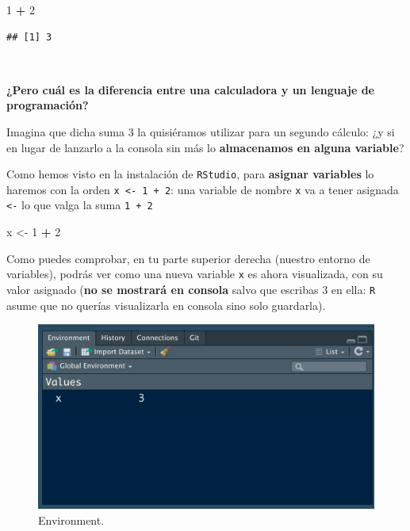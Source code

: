\documentclass[11pt,]{book}
\newenvironment{Shaded}{\begin{snugshade}}{\end{snugshade}}
\newcommand{\DecValTok}[1]{\textcolor[rgb]{0.06,0.06,0.06}{#1}}
\newcommand{\NormalTok}[1]{#1}
\newcommand{\OperatorTok}[1]{\textcolor[rgb]{0.43,0.43,0.43}{\textbf{#1}}}
\newcommand{\StringTok}[1]{\textcolor[rgb]{0.5,0.5,0.5}{#1}}
\begin{document}
\begin{Shaded}
\begin{Highlighting}[]
\DecValTok{1} \OperatorTok{+}\StringTok{ }\DecValTok{2}
\end{Highlighting}
\end{Shaded}

\begin{verbatim}
## [1] 3
\end{verbatim}

~

\textbf{¿Pero cuál es la diferencia entre una calculadora y un lenguaje de programación?}

Imagina que dicha suma 3 la quisiéramos utilizar para un segundo cálculo: ¿y si en lugar de lanzarlo a la consola sin más lo \textbf{almacenamos en alguna variable}?

Como hemos visto en la instalación de \texttt{RStudio}, para \textbf{asignar variables} lo haremos con la orden \texttt{x\ \textless{}-\ 1\ +\ 2}: una variable de nombre \texttt{x} va a tener asignada \texttt{\textless{}-} lo que valga la suma \texttt{1\ +\ 2}

\begin{Shaded}
\begin{Highlighting}[]
\NormalTok{x <-}\StringTok{ }\DecValTok{1} \OperatorTok{+}\StringTok{ }\DecValTok{2}
\end{Highlighting}
\end{Shaded}

Como puedes comprobar, en tu parte superior derecha (nuestro entorno de variables), podrás ver como una nueva variable \texttt{x} es ahora visualizada, con su valor asignado (\textbf{no se mostrará en consola} salvo que escribas 3 en ella: \texttt{R} asume que no querías visualizarla en consola sino solo guardarla).

\begin{figure}

{\centering \includegraphics[width=0.75\linewidth]{./img/environment_1} 

}

\caption{Environment.}\label{fig:unnamed-chunk-4}
\end{figure}
\end{document}
